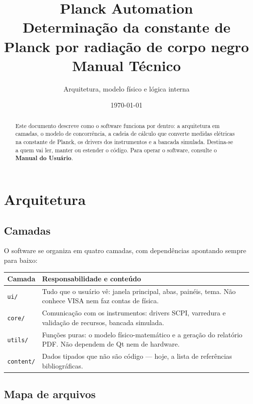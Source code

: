 \documentclass[11pt,a4paper]{article}
\title{\textbf{Planck Automation}\\[0.3em]
\large Determinação da constante de Planck por radiação de corpo negro\\[0.6em]
\Large Manual Técnico}
\author{Arquitetura, modelo físico e lógica interna}
\date{\today}
\newcommand{\arqv}[1]{\texttt{#1}}
\begin{document}
\maketitle
\thispagestyle{empty}

\begin{abstract}
\noindent
Este documento descreve como o software funciona por dentro: a arquitetura em
camadas, o modelo de concorrência, a cadeia de cálculo que converte medidas
elétricas na constante de Planck, os drivers dos instrumentos e a bancada
simulada. Destina-se a quem vai ler, manter ou estender o código. Para operar o
software, consulte o \textbf{Manual do Usuário}.
\end{abstract}

\tableofcontents
\newpage

\section{Arquitetura}

\subsection{Camadas}

O software se organiza em quatro camadas, com dependências apontando sempre
para baixo:

\begin{center}
\begin{tabular}{@{}p{3.0cm}p{11.5cm}@{}}
\toprule
\textbf{Camada} & \textbf{Responsabilidade e conteúdo} \\
\midrule
\arqv{ui/} &
Tudo que o usuário vê: janela principal, abas, painéis, tema. Não conhece
VISA nem faz contas de física. \\[0.4em]
\arqv{core/} &
Comunicação com os instrumentos: drivers SCPI, varredura e validação de
recursos, bancada simulada. \\[0.4em]
\arqv{utils/} &
Funções puras: o modelo físico-matemático e a geração do relatório PDF. Não
dependem de Qt nem de hardware. \\[0.4em]
\arqv{content/} &
Dados tipados que não são código --- hoje, a lista de referências
bibliográficas. \\
\bottomrule
\end{tabular}
\end{center}

\subsection{Mapa de arquivos}
\end{document}

